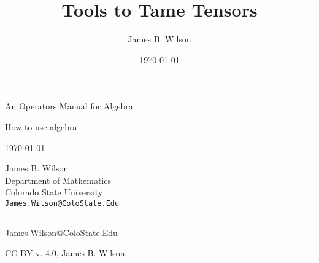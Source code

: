 \documentclass[12pt,twoside,letterpaper]{memoir}
\begin{document}
\author{James B. Wilson}
\title{Tools to Tame Tensors}
\date{\today}

      \begin{minipage}{\textwidth}
      \noindent
      {\titlefont An Operators Manual for Algebra}\par
      \epigraph{How to use algebra}%
      {\today}
      \null\vfill
      \vspace*{1cm}
      \noindent
      \hfill
      \begin{minipage}{0.35\linewidth}
            \begin{flushright}
            James B. Wilson \\
            Department of Mathematics \\
            Colorado State University\vspace{20pt} \\
            {\small \texttt{James.Wilson@ColoState.Edu}}\vspace{20pt} \\      
            \end{flushright}
      \end{minipage}
      \begin{minipage}{0.02\linewidth}
            \rule{1pt}{125pt}
      \end{minipage}
      \titlepagedecoration
      \end{minipage}

      \thispagestyle{empty}
      \newpage\thispagestyle{empty}





\vspace*{\fill}

% 

\vspace*{\fill}\thispagestyle{empty}


\frontmatter%


\vspace*{\fill}

\bigskip
James.Wilson@ColoState.Edu
\bigskip

\noindent CC-BY v. 4.0, James B. Wilson.  
\end{document}
